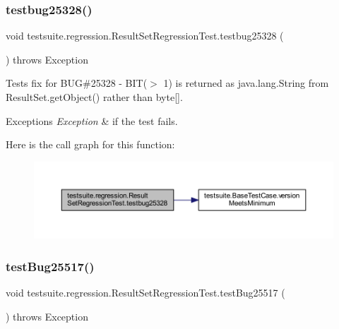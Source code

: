 \subsubsection{\texorpdfstring{testbug25328()}{testbug25328()}}
{\footnotesize\ttfamily void testsuite.\+regression.\+Result\+Set\+Regression\+Test.\+testbug25328 (\begin{DoxyParamCaption}{ }\end{DoxyParamCaption}) throws Exception}

Tests fix for B\+UG\#25328 -\/ B\+I\+T($>$ 1) is returned as java.\+lang.\+String from Result\+Set.\+get\+Object() rather than byte\mbox{[}\mbox{]}.


\begin{DoxyExceptions}{Exceptions}
{\em Exception} & if the test fails. \\
\hline
\end{DoxyExceptions}
Here is the call graph for this function\+:
\nopagebreak
\begin{figure}[H]
\begin{center}
\leavevmode
\includegraphics[width=350pt]{classtestsuite_1_1regression_1_1_result_set_regression_test_a7bcbd9c43496a10671c61673ef66c817_cgraph}
\end{center}
\end{figure}
\mbox{\label{classtestsuite_1_1regression_1_1_result_set_regression_test_a70caaccac8b8006475747f9481a529af}} 
\subsubsection{\texorpdfstring{test\+Bug25517()}{testBug25517()}}
{\footnotesize\ttfamily void testsuite.\+regression.\+Result\+Set\+Regression\+Test.\+test\+Bug25517 (\begin{DoxyParamCaption}{ }\end{DoxyParamCaption}) throws Exception}

